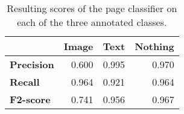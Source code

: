 \begin{table}[h]
\centering
\begin{tabular}{l r r r}
\hline
  & \textbf{Image} & \textbf{Text} & \textbf{Nothing} \\\hline
\textbf{Precision} & 0.600  & 0.995 & 0.970 \\
\textbf{Recall}    & 0.964  & 0.921 & 0.964 \\
\textbf{F2-score}  & 0.741  & 0.956 & 0.967 \\\hline
\end{tabular}
\caption{Resulting scores of the page classifier on each of the three annotated
classes.}
\label{tab:pageclasresults}
\end{table}

